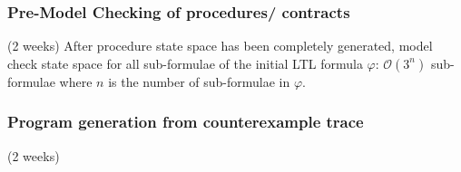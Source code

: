\documentclass[a4paper,12pt]{article}
\begin{document}
\subsubsection{Pre-Model Checking of procedures/ contracts}
(2 weeks)
After procedure state space has been completely generated, model check state space for all sub-formulae of the initial LTL formula  $\varphi$: $\mathcal{O}(3^n)$ sub-formulae where $n$ is the number of sub-formulae in $\varphi$.	

\subsubsection{Program generation from counterexample trace}
(2 weeks)
\end{document}
